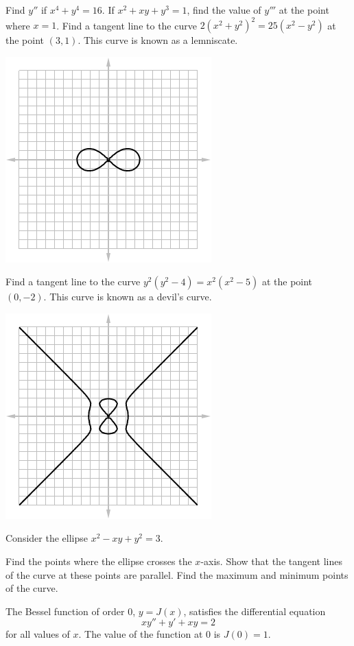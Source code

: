 \begin{questions}
\begin{center}
            \end{center}
  \questioM Find $ y'' $ if $ x^4 + y^4 = 16$.
  \questioM If $ x^2 + xy + y^3 = 1 $, find the value of $ y''' $ at the point where $ x = 1 $.
  \clearpage
  \questioM Find a tangent line to the curve $ 2(x^2 + y^2)^2 = 25(x^2 - y^2) $ at the point $ (3, 1) $. This curve is known
            as a lemniscate.
            \begin{center}
              \includegraphics[width=0.3\linewidth]{lemniscate}
            \end{center}
  \questioM Find a tangent line to the curve $ y^2(y^2 - 4) = x^2(x^2 - 5) $ at the point $ (0, -2) $. This curve is known
            as a devil's curve.
            \begin{center}
              \includegraphics[width=0.3\linewidth]{devilcurve}
            \end{center}
  \question Consider the ellipse $ x^2 - xy + y^2 = 3 $.
    \begin{parts}
      \parA Find the points where the ellipse crosses the $ x$-axis.
      \parM Show that the tangent lines of the curve at these points are parallel.
      \parE Find the maximum and minimum points of the curve.
    \end{parts}
  \questioS The Bessel function of order 0, $ y = J(x) $, satisfies the differential equation
            \begin{displaymath}
              xy'' + y' + xy = 2
            \end{displaymath}
            for all values of $ x $. The value of the function at 0 is $ J(0) = 1 $.
\end{questions}
